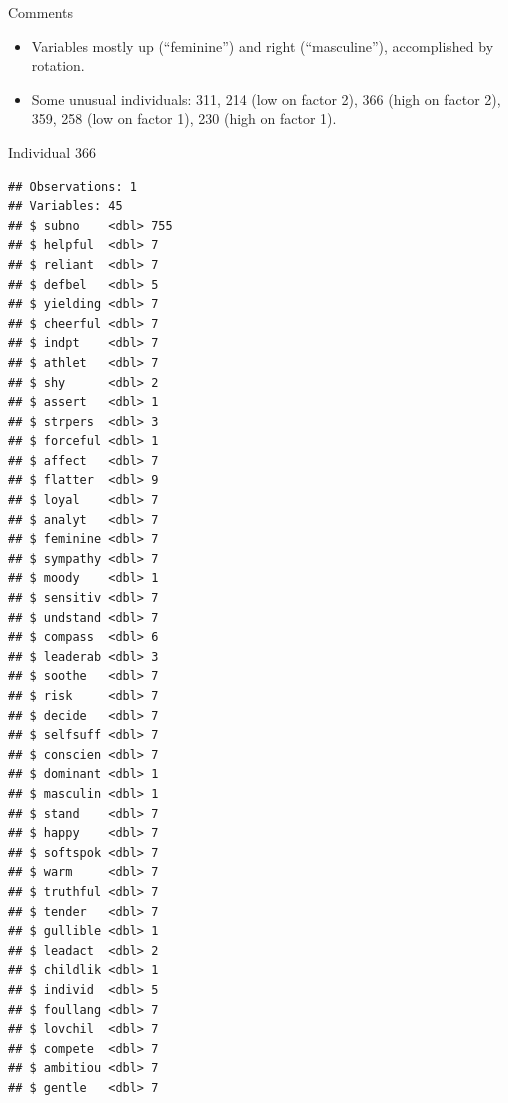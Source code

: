\documentclass[ignorenonframetext,]{beamer}
\newenvironment{Shaded}{\begin{snugshade}}{\end{snugshade}}
\newcommand{\DecValTok}[1]{\textcolor[rgb]{0.00,0.00,0.81}{#1}}
\newcommand{\KeywordTok}[1]{\textcolor[rgb]{0.13,0.29,0.53}{\textbf{#1}}}
\newcommand{\NormalTok}[1]{#1}
\newcommand{\OperatorTok}[1]{\textcolor[rgb]{0.81,0.36,0.00}{\textbf{#1}}}
\newcommand{\StringTok}[1]{\textcolor[rgb]{0.31,0.60,0.02}{#1}}
\begin{document}
\begin{frame}{Comments}
\protect\hypertarget{comments-42}{}

\begin{itemize}
\item
  Variables mostly up (``feminine'') and right (``masculine''),
  accomplished by rotation.
\item
  Some unusual individuals: 311, 214 (low on factor 2), 366 (high on
  factor 2), 359, 258 (low on factor 1), 230 (high on factor 1).
\end{itemize}

\end{frame}

\begin{frame}[fragile]{Individual 366}
\protect\hypertarget{individual-366}{}

\tiny

\begin{Shaded}
\end{Shaded}

\begin{verbatim}
## Observations: 1
## Variables: 45
## $ subno    <dbl> 755
## $ helpful  <dbl> 7
## $ reliant  <dbl> 7
## $ defbel   <dbl> 5
## $ yielding <dbl> 7
## $ cheerful <dbl> 7
## $ indpt    <dbl> 7
## $ athlet   <dbl> 7
## $ shy      <dbl> 2
## $ assert   <dbl> 1
## $ strpers  <dbl> 3
## $ forceful <dbl> 1
## $ affect   <dbl> 7
## $ flatter  <dbl> 9
## $ loyal    <dbl> 7
## $ analyt   <dbl> 7
## $ feminine <dbl> 7
## $ sympathy <dbl> 7
## $ moody    <dbl> 1
## $ sensitiv <dbl> 7
## $ undstand <dbl> 7
## $ compass  <dbl> 6
## $ leaderab <dbl> 3
## $ soothe   <dbl> 7
## $ risk     <dbl> 7
## $ decide   <dbl> 7
## $ selfsuff <dbl> 7
## $ conscien <dbl> 7
## $ dominant <dbl> 1
## $ masculin <dbl> 1
## $ stand    <dbl> 7
## $ happy    <dbl> 7
## $ softspok <dbl> 7
## $ warm     <dbl> 7
## $ truthful <dbl> 7
## $ tender   <dbl> 7
## $ gullible <dbl> 1
## $ leadact  <dbl> 2
## $ childlik <dbl> 1
## $ individ  <dbl> 5
## $ foullang <dbl> 7
## $ lovchil  <dbl> 7
## $ compete  <dbl> 7
## $ ambitiou <dbl> 7
## $ gentle   <dbl> 7
\end{verbatim}

\normalsize

\end{frame}
\end{document}
